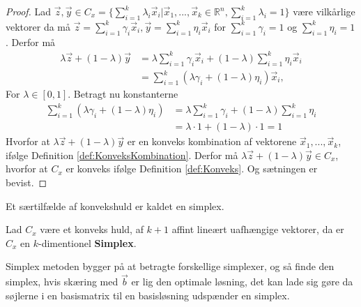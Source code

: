 \begin{proof}
Lad $\vec{z}, \vec{y}\in C_x = \{\sum_{i=1}^k \lambda_i \vec{x}_i| \vec{x}_1, ...,\vec{x}_k \in \mathds{R}^n, \sum_{i=1}^k \lambda_i =1\}$ være vilkårlige vektorer da må $\vec{z}= \sum_{i=1}^k \gamma_i \vec{x}_i, \vec{y}= \sum_{i=1}^k \eta_i \vec{x}_i$ for $\sum_{i=1}^k \gamma_i = 1$ og  $\sum_{i=1}^k \eta_i = 1$. 
Derfor må
\begin{align*}
	\lambda \vec{z} + (1- \lambda) \vec{y} &= \lambda\sum_{i=1}^k \gamma_i \vec{x}_i + (1-\lambda)\sum_{i=1}^k \eta_i \vec{x}_i
	\\ &=\sum_{i=1}^k (\lambda \gamma_i+(1-\lambda)\eta_i )\vec{x}_i,
\end{align*}
For $\lambda \in [0,1]$.
Betragt nu konstanterne 
\begin{align*}
	\sum_{i=1}^k (\lambda \gamma_i+(1-\lambda)\eta_i ) &= \lambda \sum_{i=1}^k \gamma_i + (1 - \lambda) \sum_{i=1}^k \eta_i 
	\\ &= \lambda \cdot 1 + (1 - \lambda) \cdot 1 = 1
\end{align*}
Hvorfor at $\lambda \vec{z} + (1- \lambda) \vec{y} $ er en konveks kombination af vektorene $\vec{x}_1, ...,\vec{x}_k $, ifølge Definition \ref{def:KonveksKombination}. 
Derfor må $ \lambda \vec{z} + (1- \lambda) \vec{y} \in C_x$, hvorfor at $C_x$ er konveks ifølge Definition \ref{def:Konveks}.
Og sætningen er bevist.
\end{proof}
Et særtilfælde af konvekshuld er kaldet en simplex.
\begin{defn}[Simplex]
Lad $C_x$ være et konveks huld, af $k+1$ affint lineært uafhængige vektorer, da er $C_x$ en $k$-dimentionel \textbf{Simplex}.
\end{defn}
Simplex metoden bygger på at betragte forskellige simplexer, og så finde den simplex, hvis skæring med $\vec{b}$ er lig den optimale løsning, det kan lade sig gøre da søjlerne i en basismatrix til en basisløsning udspænder en simplex.